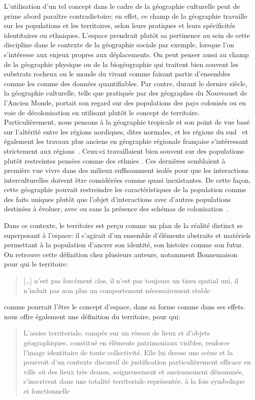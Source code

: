 L'utilisation d'un tel concept dans le cadre de la géographie culturelle peut de prime abord paraître contradictoire; en effet, ce champ de la géographie travaille  sur les populations et les territoires, selon leurs pratiques et leurs spécificités identitaires ou ethniques.
L'espace prendrait plutôt sa pertinence au sein de cette discipline dans le contexte de la géographie sociale par exemple, lorsque l'on s'intéresse aux enjeux propres aux déplacements.
On peut penser aussi au champ de la géographie physique ou de la biogéographie qui traitent bien souvent les substrats rocheux ou le monde du vivant comme faisant partie d'ensembles comme les  comme des données quantifiables.
Par contre, durant le dernier siècle, la géographie culturelle, telle que pratiquée par des géographes du Nouveau\missref et de l'Ancien Monde\missref, portait son regard sur des populations des pays colonisés ou en voie de décolonisation en utilisant plutôt le concept de territoire.
Particulièrement, nous pensons à la géographie tropicale et son point de vue basé sur l'altérité entre les régions nordiques, dites normales, et les régions du sud~\citep[493]{Power2009} et également les travaux plus anciens en géographie régionale française s'intéressant strictement aux régions~\citep[31]{Courville1991}.
Ceux-ci travaillaient bien souvent sur des populations plutôt restreintes pensées comme des ethnies .
Ces dernières semblaient à première vue vivre dans des milieux suffisamment isolés pour que les interactions interculturelles doivent être considérées comme quasi inexistantes.
De cette façon, cette géographie pouvait restreindre les caractéristiques de la population comme des faits uniques plutôt que l'objet d'interactions avec d'autres populations destinées à évoluer, avec ou sans la présence des schémas de colonisation~\citep[79--80]{DiMeo2007}.

Dans ce contexte, le territoire est perçu comme un plan de la réalité distinct se superposant à l'espace: il s'agirait d'un ensemble d'éléments abstraits et matériels permettant à la population d'ancrer son identité, son histoire comme son futur.
On retrouve cette définition chez plusieurs auteurs, notamment Bonnemaison pour qui le territoire:
\blockquote[{\cite[253]{Bonnemaison1981}}][]{[\ldots] n'est pas forcément clos, il n'est pas toujours un tissu spatial uni, il n'induit pas non plus un comportement nécessairement stable} comme pourrait l'être le concept d'espace, dans sa forme comme dans ses effets.
\citeauthor{DiMeo2007} nous offre également une définition du territoire, pour qui:
\blockquote[{\cite[76]{DiMeo2007}}][.]{L’assise territoriale, campée sur un réseau de lieux et d’objets géographiques, constitué en éléments patrimoniaux visibles, renforce l’image identitaire de toute collectivité. Elle lui dresse une scène et la pourvoit d’un contexte discursif de justification particulièrement efficace en ville où des lieux très denses, soigneusement et anciennement dénommés, s’inscrivent dans une totalité territoriale représentée, à la fois symbolique et fonctionnelle}. 

